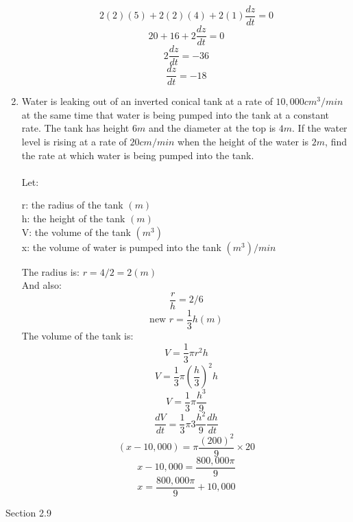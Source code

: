 \documentclass[12pt]{article}
\begin{document}
\begin{enumerate}
    \[2(2)(5)+2(2)(4)+2(1)\frac{dz}{dt} = 0\]
    \[20+16+2\frac{dz}{dt} = 0\]
    \[2\frac{dz}{dt} = -36\]
    \[\boxed{\frac{dz}{dt} = -18}\]
    \setcounter{enumi}{24}
    \item Water is leaking out of an inverted conical tank at a rate of $10,000cm^3/min$ at the same time that water is being pumped into the tank at a constant rate. The tank has height $6m$ and the diameter at the top is $4m$. If the water level is rising at a rate of $20cm/min$ when the height of the water is $2m$, find the rate at which water is being pumped into the tank.\\~\\
    Let:
    \begin{center}
        r: the radius of the tank $(m)$\\
        h: the height of the tank $(m)$\\
        V: the volume of the tank $(m^3)$\\
        x: the volume of water is pumped into the tank $(m^3)/min$
    \end{center}
    The radius is: $r = 4/2 = 2(m)$\\
    And also:
    \[\frac{r}{h} = 2/6\]
    \[\text{new }r = \frac{1}{3}h(m)\]
    The volume of the tank is:
    \[V = \frac{1}{3}\pi r^2h\]
    \[V = \frac{1}{3}\pi (\frac{h}{3})^2h\]
    \[V = \frac{1}{3}\pi \frac{h^3}{9}\]
    \[\frac{dV}{dt} = \frac{1}{3}\pi 3\frac{h^2}{9}\frac{dh}{dt}\]
    \[(x - 10,000)= \pi \frac{(200)^2}{9}\times 20\]
    \[x - 10,000=\frac{800,000\pi}{9}\]
    \[\boxed{x = \frac{800,000\pi}{9} + 10,000}\]
\end{enumerate}

Section 2.9
\end{document}
